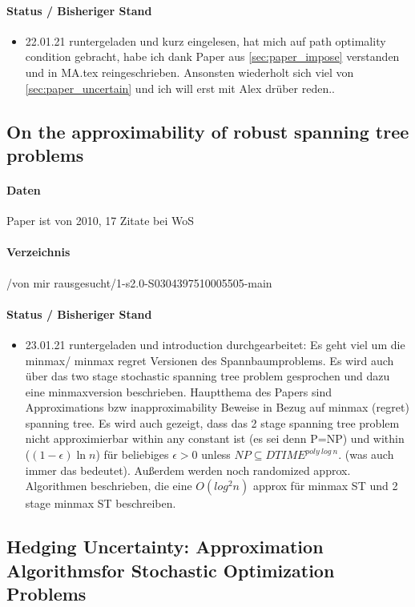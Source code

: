 \documentclass[paper=a4,10pt]{scrartcl}
\begin{document}
\paragraph{Status / Bisheriger Stand}
\begin{itemize}
\item 22.01.21 runtergeladen und kurz eingelesen, hat mich auf path optimality condition gebracht, habe ich dank Paper aus \ref{sec:paper_impose} verstanden und in MA.tex reingeschrieben. Ansonsten wiederholt sich viel von \ref{sec:paper_uncertain} und ich will erst mit Alex drüber reden..
\end{itemize}

\subsection{On the approximability of robust spanning tree problems}
\label{sec:paper_robust_minmax}
\paragraph{Daten} Paper ist von 2010, 17 Zitate bei WoS
\paragraph{Verzeichnis}  /von mir rausgesucht/1-s2.0-S0304397510005505-main
\paragraph{Status / Bisheriger Stand}
\begin{itemize}
\item 23.01.21 runtergeladen und introduction durchgearbeitet: Es geht viel um die minmax/ minmax regret Versionen des Spannbaumproblems. Es wird auch über das two stage stochastic spanning tree problem gesprochen und dazu eine minmaxversion beschrieben. Hauptthema des Papers sind Approximations bzw inapproximability Beweise in Bezug auf minmax (regret) spanning tree.
Es wird auch gezeigt, dass das 2 stage spanning tree problem nicht approximierbar within any constant ist (es sei denn P=NP) und within ($(1-\epsilon) \ln n$) für beliebiges $\epsilon >0$ unless $NP \subseteq DTIME^{poly \ log \ n}$. (was auch immer das bedeutet). Außerdem werden noch randomized approx. Algorithmen beschrieben, die eine $O(log^2 n)$ approx für minmax ST und 2 stage minmax ST beschreiben.
\end{itemize}

\subsection{Hedging Uncertainty: Approximation Algorithmsfor Stochastic Optimization Problems}
\label{sec:paper_hedging}
\end{document}
